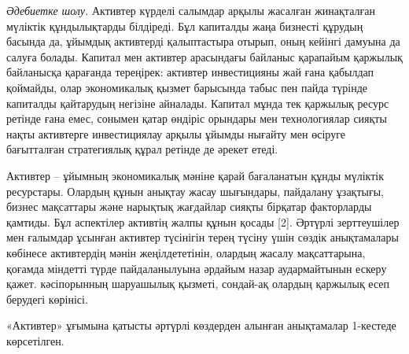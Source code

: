\begin{multicols}{2}
\emph{Әдебиетке шолу.} Активтер күрделі салымдар арқылы
жасалған жинақталған мүліктік құндылықтарды білдіреді. Бұл капиталды
жаңа бизнесті құрудың басында да, ұйымдық активтерді қалыптастыра
отырып, оның кейінгі дамуына да салуға болады. Капитал мен активтер
арасындағы байланыс қарапайым қаржылық байланысқа қарағанда тереңірек:
активтер инвестицияны жай ғана қабылдап қоймайды, олар экономикалық
қызмет барысында табыс пен пайда түрінде капиталды қайтарудың негізіне
айналады. Капитал мұнда тек қаржылық ресурс ретінде ғана емес, сонымен
қатар өндіріс орындары мен технологиялар сияқты нақты активтерге
инвестициялау арқылы ұйымды нығайту мен өсіруге бағытталған стратегиялық
құрал ретінде де әрекет етеді.

Активтер -- ұйымның экономикалық мәніне қарай бағаланатын құнды мүліктік
ресурстары. Олардың құнын анықтау жасау шығындары, пайдалану ұзақтығы,
бизнес мақсаттары және нарықтық жағдайлар сияқты бірқатар факторларды
қамтиды. Бұл аспектілер активтің жалпы құнын қосады {[}2{]}. Әртүрлі
зерттеушілер мен ғалымдар ұсынған активтер түсінігін терең түсіну үшін
сөздік анықтамалары көбінесе активтердің мәнін жеңілдететінін, олардың
жасалу мақсаттарына, қоғамда міндетті түрде пайдаланылуына әрдайым назар
аудармайтынын ескеру қажет. кәсіпорынның шаруашылық қызметі, сондай-ақ
олардың қаржылық есеп берудегі көрінісі.

«Активтер» ұғымына қатысты әртүрлі көздерден алынған анықтамалар
1-кестеде көрсетілген.
\end{multicols}

